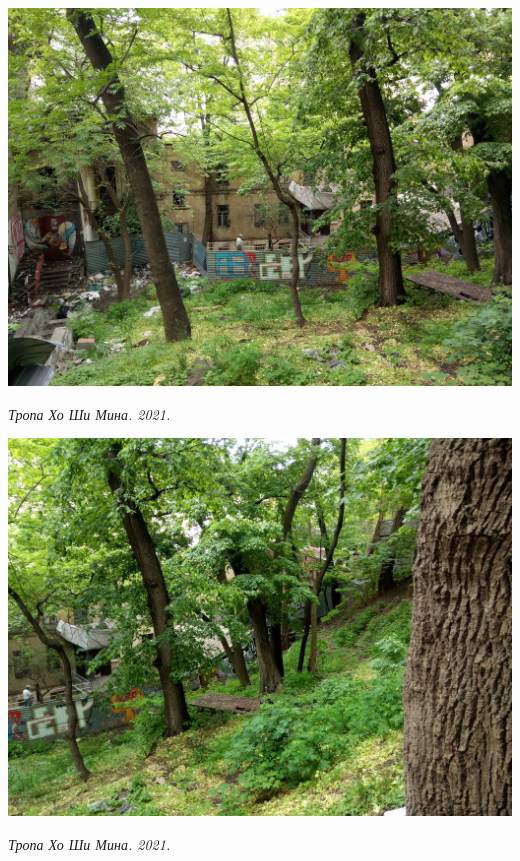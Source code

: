 \begin{center}
\includegraphics[width=\linewidth]{rpix/IMG_20210601_134940.jpg}

\textit{Тропа Хо Ши Мина. 2021.}
\end{center}



\begin{center}
\includegraphics[width=\linewidth]{rpix/IMG_20210601_134942.jpg}

\textit{Тропа Хо Ши Мина. 2021.}
\end{center}



